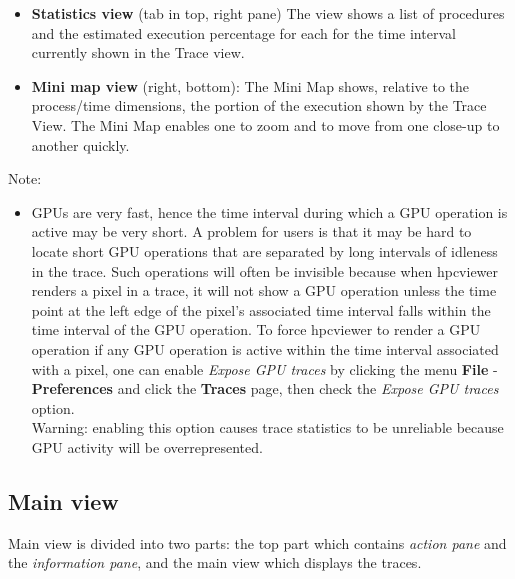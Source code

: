 \documentclass[english]{article}
\begin{document}
\begin{itemize}
\item \textbf{Statistics view} (tab in top, right pane)
  The view shows a list of procedures and the estimated execution percentage for each for the time interval currently shown in the Trace view.


\item \textbf{Mini map view} (right, bottom):
  The Mini Map shows, relative to the process/time dimensions, the portion of the execution shown by the Trace View.
  The Mini Map enables one to zoom and to move from one close-up to another quickly.

\end{itemize}
Note:
\begin{itemize}
\item GPUs are very fast, hence the time interval during which a GPU operation is active may be very short. A problem for users is that it may be hard to locate short GPU operations that are separated by long intervals of idleness in the trace. Such operations will often be invisible because
 when hpcviewer renders a pixel in a trace, it will not show a GPU operation unless the time point at the left edge of the pixel's associated time interval falls within the time interval of the GPU operation.
 	To force hpcviewer to render a GPU operation if any GPU operation is active within the time interval associated with a pixel, one can enable \emph{Expose GPU traces} by clicking the menu \textbf{File} - \textbf{Preferences} and click the \textbf{Traces} page, then check the \emph{Expose GPU traces} option.
\\
Warning: enabling this option causes trace statistics to be unreliable because GPU activity will be overrepresented.
\end{itemize}




\subsection{Main view}

Main view is divided into two parts: the top part which contains \emph{action pane} and the \emph{information pane}, and the main view which displays the traces.
\end{document}
